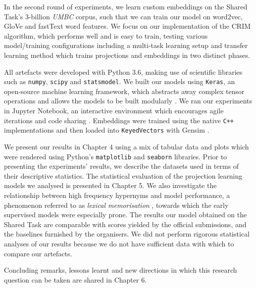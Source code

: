In the second round of experiments, we learn custom embeddings on the Shared Task's 3-billion \textit{UMBC} corpus, such that we can train our model on word2vec, GloVe and fastText word features.  We focus on our implementation of the CRIM algorithm, which performs well and is easy to train, testing various model/training configurations including a multi-task learning setup and transfer learning method which trains projections and embeddings in two distinct phases.

All artefacts were developed with Python 3.6, making use of scientific libraries such as \texttt{numpy}, \texttt{scipy} and \texttt{statsmodel}.  We built our models using \texttt{Keras}, an open-source machine learning framework, which abstracts away complex tensor operations and allows the models to be built modularly \citep{chollet2015keras}.  We ran our experiments in Jupyter Notebook, an interactive environment which encourages agile iterations and code sharing \citep{kluyver2016jupyter}.  Embeddings were trained using the native \texttt{C++} implementations and then loaded into \texttt{KeyedVectors} with Gensim \citep{rehurek_lrec}.

We present our results in Chapter 4 using a mix of tabular data and plots which were rendered using Python's \texttt{matplotlib} and \texttt{seaborn} libraries.  Prior to presenting the experiments' results, we describe the datasets used in terms of their descriptive statistics.  The statistical evaluation of the projection learning models we analysed is presented in Chapter 5.  We also investigate the relationship between high frequency hypernyms and model performance, a phenomenon referred to as \textit{lexical memorisation} \citep{levy2015supervised}, towards which the early supervised models were especially prone.  The results our model obtained on the Shared Task are comparable with scores yielded by the official submissions, and the baselines furnished by the organisers.  We did not perform  rigorous statistical analyses of our results because we do not have sufficient data with which to compare our artefacts.

Concluding remarks, lessons learnt and new directions in which this research question can be taken are shared in Chapter 6.
